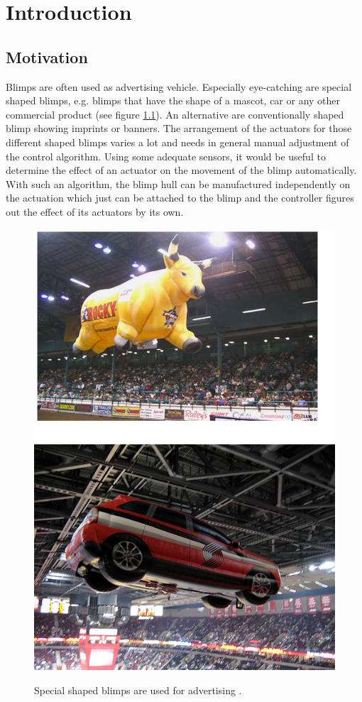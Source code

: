 \chapter{Introduction}
\label{chap:introduction}

\section{Motivation}
Blimps are often used as advertising vehicle. Especially eye-catching are special shaped blimps, e.g. blimps that have the shape of a mascot, car or any other commercial product (see figure \ref{fig:blimps}). An alternative are conventionally shaped blimp showing imprints or banners. The arrangement of the actuators for those different shaped blimps varies a lot and needs in general manual adjustment of the control algorithm. Using some adequate sensors, it would be useful to determine the effect of an actuator on the movement of the blimp automatically. With such an algorithm, the blimp hull can be manufactured independently on the actuation which just can be attached to the blimp and the controller figures out the effect of its actuators by its own.

\begin{figure}[hbtp]
\label{fig:blimps}
\centering
\includegraphics[width=.4\linewidth]{images/CustomBull_Lg.jpg}
\includegraphics[width=.4\linewidth]{images/CustomCar.jpg}
\caption{Special shaped blimps are used for advertising \cite{rcblimps}.}
\end{figure}


